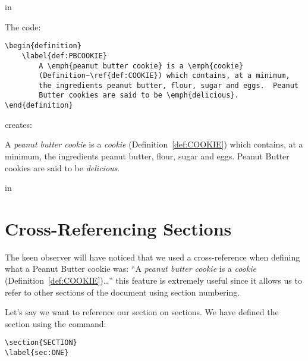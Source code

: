  in

The code:
\begin{verbatim}
\begin{definition}
    \label{def:PBCOOKIE}
        A \emph{peanut butter cookie} is a \emph{cookie}
        (Definition~\ref{def:COOKIE}) which contains, at a minimum,
        the ingredients peanut butter, flour, sugar and eggs.  Peanut
        Butter cookies are said to be \emph{delicious}.
\end{definition}
\end{verbatim}

\noindent creates:
\begin{definition}
    \label{def:PBCOOKIE}
        A \emph{peanut butter cookie} is a \emph{cookie}
        (Definition~\ref{def:COOKIE}) which contains, at a minimum,
        the ingredients peanut butter, flour, sugar and eggs.  Peanut
        Butter cookies are said to be \emph{delicious}.
\end{definition}

%
%


 in

\section{Cross-Referencing Sections}
\label{sec:CROSS_REF}

The keen observer will have noticed that we used a cross-reference
when defining what a Peanut Butter cookie was: ``A 
\emph{peanut butter cookie} is a \emph{cookie} 
(Definition~\ref{def:COOKIE})\dots'' this feature is extremely useful
since it allows us to refer to other sections of the document
using section numbering.

Let's say we want to reference our section on sections.
We have defined the section using the command:

\begin{verbatim}
\section{SECTION}
\label{sec:ONE}
\end{verbatim}


